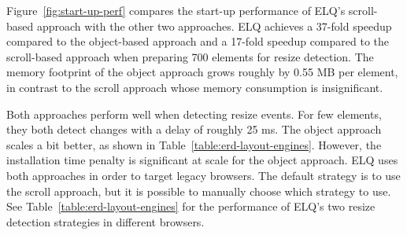 \documentclass[sigplan,9pt]{acmart}
\newcommand{\elq}{ELQ}
\begin{document}
    Figure~\ref{fig:start-up-perf} compares the start-up performance
    of \elq{}'s scroll-based approach with the other two approaches.
    \elq{} achieves a 37-fold speedup compared to the object-based
    approach and a 17-fold speedup compared to the scroll-based
    approach when preparing 700 elements for resize detection.
    The memory footprint of the object approach grows roughly by 0.55 MB per element, in contrast to the scroll approach whose memory consumption is insignificant.

    Both approaches perform well when detecting resize events. For few elements, they both detect changes with a delay of roughly 25 ms.
    The object approach scales a bit better, as shown in Table~\ref{table:erd-layout-engines}. However, the installation time penalty is significant at scale for the object approach.
    \elq{} uses both approaches in order to target legacy browsers. The default strategy is to use the scroll approach, but it is possible to manually choose which strategy to use.
    See Table~\ref{table:erd-layout-engines} for the performance of \elq{}'s two resize detection strategies in different browsers.
\end{document}
